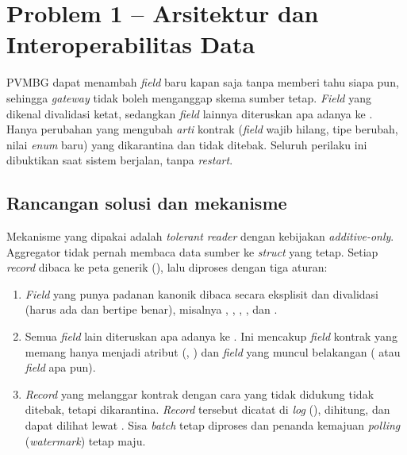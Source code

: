 \chapter{Problem 1 -- Arsitektur dan Interoperabilitas Data}

\begin{ringkas}
PVMBG dapat menambah \emph{field} baru kapan saja tanpa memberi tahu siapa pun, sehingga \emph{gateway} tidak boleh menganggap skema
sumber tetap. \emph{Field} yang dikenal divalidasi ketat, sedangkan \emph{field} lainnya diteruskan apa adanya ke .
Hanya perubahan yang mengubah \emph{arti} kontrak (\emph{field} wajib hilang, tipe berubah, nilai \emph{enum} baru) yang dikarantina
dan tidak ditebak. Seluruh perilaku ini dibuktikan saat sistem berjalan, tanpa \emph{restart}.
\end{ringkas}

\section{Rancangan solusi dan mekanisme}

Mekanisme yang dipakai adalah \emph{tolerant reader} dengan kebijakan \emph{additive-only}. Aggregator tidak pernah
membaca data sumber ke \emph{struct} yang tetap. Setiap \emph{record} dibaca ke peta generik (), lalu
diproses dengan tiga aturan:

\begin{enumerate}
 \item \emph{Field} yang punya padanan kanonik dibaca secara eksplisit dan divalidasi (harus ada dan bertipe benar), misalnya , , , , dan .
 \item Semua \emph{field} lain diteruskan apa adanya ke . Ini mencakup \emph{field} kontrak yang memang hanya menjadi atribut (, ) dan \emph{field} yang muncul belakangan ( atau \emph{field} apa pun).
 \item \emph{Record} yang melanggar kontrak dengan cara yang tidak didukung tidak ditebak, tetapi dikarantina. \emph{Record} tersebut dicatat di \emph{log} (), dihitung, dan dapat dilihat lewat . Sisa \emph{batch} tetap diproses dan penanda kemajuan \emph{polling} (\emph{watermark}) tetap maju.
\end{enumerate}

